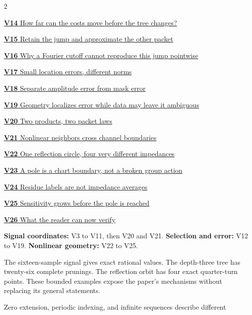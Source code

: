 \documentclass[11pt,letterpaper]{article}
\newcommand{\head}[1]{\par\vspace{2pt}{\sffamily\bfseries\normalsize #1}\par\vspace{1pt}}
\begin{document}
\begin{multicols}{2}
{\small\noindent\hyperlink{vpage14}{\textbf{V14} How far can the costs move before the tree changes?}\par\smallskip}
{\small\noindent\hyperlink{vpage15}{\textbf{V15} Retain the jump and approximate the other packet}\par\smallskip}
{\small\noindent\hyperlink{vpage16}{\textbf{V16} Why a Fourier cutoff cannot reproduce this jump pointwise}\par\smallskip}
{\small\noindent\hyperlink{vpage17}{\textbf{V17} Small location errors, different norms}\par\smallskip}
{\small\noindent\hyperlink{vpage18}{\textbf{V18} Separate amplitude error from mask error}\par\smallskip}
{\small\noindent\hyperlink{vpage19}{\textbf{V19} Geometry localizes error while data may leave it ambiguous}\par\smallskip}
{\small\noindent\hyperlink{vpage20}{\textbf{V20} Two products, two packet laws}\par\smallskip}
{\small\noindent\hyperlink{vpage21}{\textbf{V21} Nonlinear neighbors cross channel boundaries}\par\smallskip}
{\small\noindent\hyperlink{vpage22}{\textbf{V22} One reflection circle, four very different impedances}\par\smallskip}
{\small\noindent\hyperlink{vpage23}{\textbf{V23} A pole is a chart boundary, not a broken group action}\par\smallskip}
{\small\noindent\hyperlink{vpage24}{\textbf{V24} Residue labels are not impedance averages}\par\smallskip}
{\small\noindent\hyperlink{vpage25}{\textbf{V25} Sensitivity grows before the pole is reached}\par\smallskip}
{\small\noindent\hyperlink{vpage26}{\textbf{V26} What the reader can now verify}\par\smallskip}
\end{multicols}
\medskip
\head{Three reading routes}
\textbf{Signal coordinates:} V3 to V11, then V20 and V21.
\textbf{Selection and error:} V12 to V19.
\textbf{Nonlinear geometry:} V22 to V25.
\head{One model per question}
The sixteen-sample signal gives exact rational values. The depth-three tree
has twenty-six complete prunings. The reflection orbit has four exact
quarter-turn points. These bounded examples expose the paper's mechanisms
without replacing its general statements.
\head{Read the hypotheses with the picture}
Zero extension, periodic indexing, and infinite sequences describe different
\end{document}
